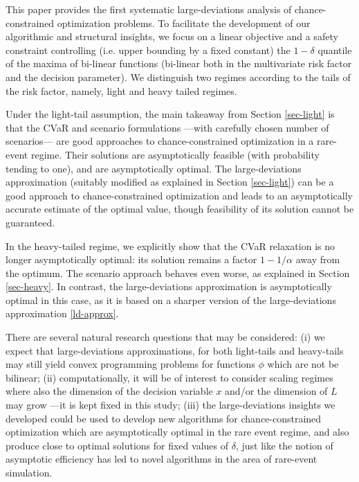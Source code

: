 \documentclass[a4paper, a4wide, 10pt, reqno]{amsart}
\theoremstyle{plain}
\begin{document}
This paper provides the first systematic large-deviations analysis of chance-constrained optimization problems. To facilitate the development of our  algorithmic and structural insights, we focus on a linear objective and a safety constraint controlling (i.e. upper bounding by a fixed constant) the $1-\delta$ quantile of the maxima of bi-linear functions (bi-linear both in the multivariate risk factor and the decision parameter). 
We distinguish two regimes according to the tails of the risk factor, namely, light and heavy tailed regimes. 

\smallskip
Under the light-tail assumption, 
the main takeaway from Section \ref{sec-light} is that the CVaR and scenario formulations ---with carefully chosen number of scenarios--- are good approaches to chance-constrained optimization in a rare-event regime. Their solutions are asymptotically feasible (with probability tending to one), and are asymptotically optimal. The large-deviations approximation  (suitably modified as explained in Section \ref{sec-light}) can be a good approach to  chance-constrained optimization and leads to an asymptotically accurate estimate of the optimal value, though feasibility of its solution cannot be guaranteed. 

\smallskip
In the heavy-tailed regime, we explicitly show that the CVaR relaxation is no longer asymptotically optimal: its solution remains a factor $1-1/\alpha$ away from the optimum. The scenario approach behaves even worse, as explained in Section \ref{sec-heavy}. In contrast, the large-deviations approximation is asymptotically optimal in this case, as it is based on a sharper version of the large-deviations approximation  \eqref{ld-approx}. 

\smallskip
There are several natural research questions that may be considered:  (i) we expect that large-deviations approximations, for both light-tails and heavy-tails may still yield convex programming problems for functions $\phi$ which are not be bilinear; (ii)  computationally, it will be of interest to consider scaling regimes where also the dimension of the decision variable $x$ and/or the dimension of $L$ may grow ---it is kept fixed in this study; (iii) the large-deviations insights we developed could be used to develop new algorithms for chance-constrained optimization which
are asymptotically optimal in the rare event regime, and also produce close to optimal solutions for fixed values of $\delta$, just like the notion of asymptotic efficiency has led to novel algorithms in the area of rare-event simulation. 
\end{document}
